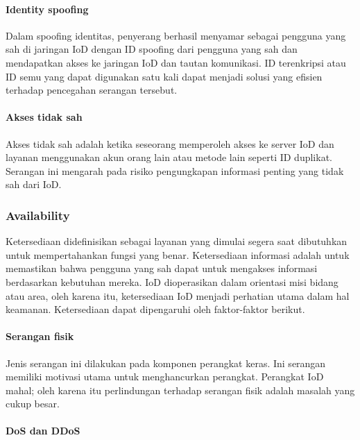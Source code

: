 \paragraph{Identity spoofing}
\label{par:identityspoofing}

Dalam spoofing identitas, penyerang berhasil menyamar sebagai pengguna yang sah di jaringan IoD dengan ID spoofing dari pengguna yang sah dan mendapatkan akses ke jaringan IoD dan tautan komunikasi. ID terenkripsi atau ID semu yang dapat digunakan satu kali dapat menjadi solusi yang efisien terhadap pencegahan serangan tersebut.

\paragraph{Akses tidak sah}
\label{par:aksestidaksah}

Akses tidak sah adalah ketika seseorang memperoleh akses ke server IoD dan layanan menggunakan akun orang lain atau metode lain seperti ID duplikat. Serangan ini mengarah pada risiko pengungkapan informasi penting yang tidak sah dari IoD.

\subsubsection{Availability}
\label{subsubsec:availability}

Ketersediaan didefinisikan sebagai layanan yang dimulai segera saat dibutuhkan untuk mempertahankan fungsi yang benar. Ketersediaan informasi adalah untuk memastikan bahwa pengguna yang sah dapat untuk mengakses informasi berdasarkan kebutuhan mereka. IoD dioperasikan dalam orientasi misi bidang atau area, oleh karena itu, ketersediaan IoD menjadi perhatian utama dalam hal keamanan. Ketersediaan dapat dipengaruhi oleh faktor-faktor berikut.

\paragraph{Serangan fisik}
\label{par:seranganfisik}

Jenis serangan ini dilakukan pada komponen perangkat keras. Ini serangan memiliki motivasi utama untuk menghancurkan perangkat. Perangkat IoD mahal; oleh karena itu perlindungan terhadap serangan fisik adalah masalah yang cukup besar.

\paragraph{DoS dan DDoS}
\label{par:ddos}

